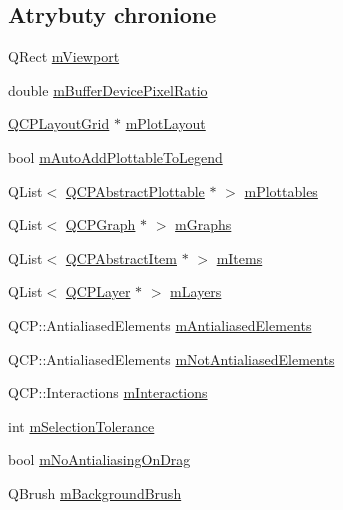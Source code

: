 \subsection*{Atrybuty chronione}
\begin{DoxyCompactItemize}
\item 
Q\+Rect \hyperlink{class_q_custom_plot_ac0a7c38a715526c257cff95774f83ab6}{m\+Viewport}
\item 
double \hyperlink{class_q_custom_plot_a63a40c57a2d89eea27b90b62cc4eee1f}{m\+Buffer\+Device\+Pixel\+Ratio}
\item 
\hyperlink{class_q_c_p_layout_grid}{Q\+C\+P\+Layout\+Grid} $\ast$ \hyperlink{class_q_custom_plot_ac97298756882a0eecd98151679850ac1}{m\+Plot\+Layout}
\item 
bool \hyperlink{class_q_custom_plot_aaf3ea6a4cb04d35a149cc9a0cdac3394}{m\+Auto\+Add\+Plottable\+To\+Legend}
\item 
Q\+List$<$ \hyperlink{class_q_c_p_abstract_plottable}{Q\+C\+P\+Abstract\+Plottable} $\ast$ $>$ \hyperlink{class_q_custom_plot_a62bf8e4e7f8d23fc1e9301ba0148269f}{m\+Plottables}
\item 
Q\+List$<$ \hyperlink{class_q_c_p_graph}{Q\+C\+P\+Graph} $\ast$ $>$ \hyperlink{class_q_custom_plot_adaf8d407d72a725169d7dbed2ee386bb}{m\+Graphs}
\item 
Q\+List$<$ \hyperlink{class_q_c_p_abstract_item}{Q\+C\+P\+Abstract\+Item} $\ast$ $>$ \hyperlink{class_q_custom_plot_a6a93905372326e31e98d6c3bc8953ec8}{m\+Items}
\item 
Q\+List$<$ \hyperlink{class_q_c_p_layer}{Q\+C\+P\+Layer} $\ast$ $>$ \hyperlink{class_q_custom_plot_a72ee313041b873d76c198793ce7e6c37}{m\+Layers}
\item 
Q\+C\+P\+::\+Antialiased\+Elements \hyperlink{class_q_custom_plot_aa333200629256830e273873b582a5524}{m\+Antialiased\+Elements}
\item 
Q\+C\+P\+::\+Antialiased\+Elements \hyperlink{class_q_custom_plot_a2b6ebcad00a90ba07f146cefcd4293da}{m\+Not\+Antialiased\+Elements}
\item 
Q\+C\+P\+::\+Interactions \hyperlink{class_q_custom_plot_ad717377ceba7493b4b32f0bcbbdf1895}{m\+Interactions}
\item 
int \hyperlink{class_q_custom_plot_abc36e12dd0482117ad810a800c847722}{m\+Selection\+Tolerance}
\item 
bool \hyperlink{class_q_custom_plot_ac83df968435f6b8ec79f2993ab9124e8}{m\+No\+Antialiasing\+On\+Drag}
\item 
Q\+Brush \hyperlink{class_q_custom_plot_a3aef5de4ac012178e3293248e9c63737}{m\+Background\+Brush}

\end{DoxyCompactItemize}

